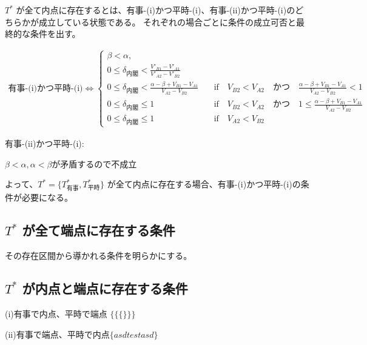 \documentclass[main.tex]{subfiles}
\begin{document}
\bigskip
$T^*$ が全て内点に存在するとは、有事-(i)かつ平時-(i)、有事-(ii)かつ平時-(i)のどちらかが成立している状態である。
それぞれの場合ごとに条件の成立可否と最終的な条件を出す。

\noindent
\begin{align*}
    \text{有事-(i)かつ平時-(i)} \Leftrightarrow 
    \begin{cases}
        \beta < \alpha, \\
        0 \le \delta_{内閣} < \frac{V'_{B1}-V'_{A1}}{V'_{A2} - V'_{B2}}\\
        0 \le \delta_{内閣} < \frac{\alpha-\beta + V_{B1}-V_{A1}}{V_{A2} - V_{B2}} \quad&\text{if}\quad V_{B2} < V_{A2} \quad{かつ}\quad \frac{\alpha-\beta + V_{B1}-V_{A1}}{V_{A2} - V_{B2}}<1\\
        0 \le \delta_{内閣} \le 1 \quad&\text{if}\quad V_{B2} < V_{A2} \quad{かつ}\quad 1 \le \frac{\alpha-\beta + V_{B1}-V_{A1}}{V_{A2} - V_{B2}}\\
        0 \le \delta_{内閣} \le 1 \quad&\text{if}\quad V_{A2} < V_{B2}
    \end{cases}
\end{align*}

\noindent
有事-(ii)かつ平時-(i):

$\beta < \alpha, \alpha < \beta$が矛盾するので不成立


\bigskip
よって、$T^* = \lbrace T^*_{有事}, T^*_{平時} \rbrace$ が全て内点に存在する場合、有事-(i)かつ平時-(i)の条件が必要になる。





\subsection{$T^*$ が全て端点に存在する条件}

その存在区間から導かれる条件を明らかにする。



\subsection{$T^*$ が内点と端点に存在する条件}

(i)有事で内点、平時で端点 $\Big\{  \big\{ \{\} \big\} \Big\} $

(ii)有事で端点、平時で内点$\lbrace asd   test asd \rbrace$


\theendnotes %
\end{document}
